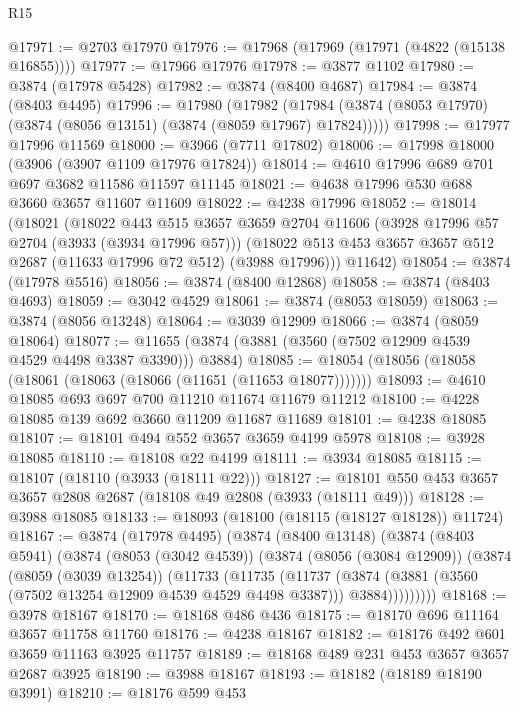 \begin{lexlean}{R15}
\begin{coremodule}
@17971 := @2703 @17970
@17976 := @17968 (@17969 (@17971 (@4822 (@15138 @16855))))
@17977 := @17966 @17976
@17978 := @3877 @1102
@17980 := @3874 (@17978 @5428)
@17982 := @3874 (@8400 @4687)
@17984 := @3874 (@8403 @4495)
@17996 := @17980
    (@17982 (@17984 (@3874 (@8053 @17970) (@3874 (@8056 @13151) (@3874 (@8059 @17967) @17824)))))
@17998 := @17977 @17996 @11569
@18000 := @3966 (@7711 @17802)
@18006 := @17998 @18000 (@3906 (@3907 @1109 @17976 @17824))
@18014 := @4610 @17996 @689 @701 @697 @3682 @11586 @11597 @11145
@18021 := @4638 @17996 @530 @688 @3660 @3657 @11607 @11609
@18022 := @4238 @17996
@18052 := @18014
    (@18021
      (@18022
        @443
        @515
        @3657
        @3659
        @2704
        @11606
        (@3928 @17996 @57 @2704 (@3933 (@3934 @17996 @57)))
        (@18022 @513 @453 @3657 @3657 @512 @2687 (@11633 @17996 @72 @512) (@3988 @17996)))
      @11642)
@18054 := @3874 (@17978 @5516)
@18056 := @3874 (@8400 @12868)
@18058 := @3874 (@8403 @4693)
@18059 := @3042 @4529
@18061 := @3874 (@8053 @18059)
@18063 := @3874 (@8056 @13248)
@18064 := @3039 @12909
@18066 := @3874 (@8059 @18064)
@18077 := @11655 (@3874 (@3881 (@3560 (@7502 @12909 @4539 @4529 @4498 @3387 @3390))) @3884)
@18085 := @18054 (@18056 (@18058 (@18061 (@18063 (@18066 (@11651 (@11653 @18077)))))))
@18093 := @4610 @18085 @693 @697 @700 @11210 @11674 @11679 @11212
@18100 := @4228 @18085 @139 @692 @3660 @11209 @11687 @11689
@18101 := @4238 @18085
@18107 := @18101 @494 @552 @3657 @3659 @4199 @5978
@18108 := @3928 @18085
@18110 := @18108 @22 @4199
@18111 := @3934 @18085
@18115 := @18107 (@18110 (@3933 (@18111 @22)))
@18127 := @18101 @550 @453 @3657 @3657 @2808 @2687 (@18108 @49 @2808 (@3933 (@18111 @49)))
@18128 := @3988 @18085
@18133 := @18093 (@18100 (@18115 (@18127 @18128)) @11724)
@18167 := @3874
    (@17978 @4495)
    (@3874
      (@8400 @13148)
      (@3874
        (@8403 @5941)
        (@3874
          (@8053 (@3042 @4539))
          (@3874
            (@8056 (@3084 @12909))
            (@3874
              (@8059 (@3039 @13254))
              (@11733
                (@11735
                  (@11737
                    (@3874
                      (@3881 (@3560 (@7502 @13254 @12909 @4539 @4529 @4498 @3387)))
                      @3884)))))))))
@18168 := @3978 @18167
@18170 := @18168 @486 @436
@18175 := @18170 @696 @11164 @3657 @11758 @11760
@18176 := @4238 @18167
@18182 := @18176 @492 @601 @3659 @11163 @3925 @11757
@18189 := @18168 @489 @231 @453 @3657 @3657 @2687 @3925
@18190 := @3988 @18167
@18193 := @18182 (@18189 @18190 @3991)
@18210 := @18176
    @599
    @453

\end{coremodule}
\end{lexlean}
